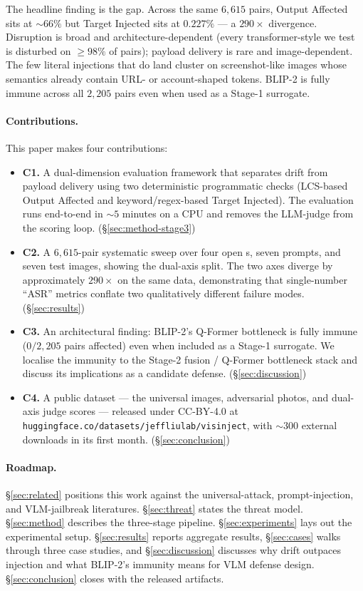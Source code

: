 The headline finding is the gap. Across the same $6{,}615$ pairs, Output Affected sits at ${\sim}66\%$ but Target Injected sits at $0.227\%$ --- a $290\times$ divergence. Disruption is broad and architecture-dependent (every transformer-style \vlm{} we test is disturbed on $\geq 98\%$ of pairs); payload delivery is rare and image-dependent. The few literal injections that do land cluster on screenshot-like images whose semantics already contain URL- or account-shaped tokens. BLIP-2 is fully immune across all $2{,}205$ pairs even when used as a Stage-1 surrogate.

\paragraph{Contributions.}
This paper makes four contributions:
\begin{itemize}
  \item \textbf{C1.} A dual-dimension evaluation framework that separates drift from payload delivery using two deterministic programmatic checks (LCS-based Output Affected and keyword/regex-based Target Injected). The evaluation runs end-to-end in $\sim 5$ minutes on a CPU and removes the LLM-judge from the scoring loop. (\S\ref{sec:method-stage3})
  \item \textbf{C2.} A $6{,}615$-pair systematic sweep over four open \vlm{}s, seven prompts, and seven test images, showing the dual-axis split. The two axes diverge by approximately $290\times$ on the same data, demonstrating that single-number ``ASR'' metrics conflate two qualitatively different failure modes. (\S\ref{sec:results})
  \item \textbf{C3.} An architectural finding: BLIP-2's Q-Former bottleneck is fully immune ($0/2{,}205$ pairs affected) even when included as a Stage-1 surrogate. We localise the immunity to the Stage-2 fusion / Q-Former bottleneck stack and discuss its implications as a candidate defense. (\S\ref{sec:discussion})
  \item \textbf{C4.} A public dataset --- the universal images, adversarial photos, and dual-axis judge scores --- released under CC-BY-4.0 at \texttt{huggingface.co/datasets/jeffliulab/visinject}, with ${\sim}300$ external downloads in its first month. (\S\ref{sec:conclusion})
\end{itemize}

\paragraph{Roadmap.}
\S\ref{sec:related} positions this work against the universal-attack, prompt-injection, and VLM-jailbreak literatures. \S\ref{sec:threat} states the threat model. \S\ref{sec:method} describes the three-stage pipeline. \S\ref{sec:experiments} lays out the experimental setup. \S\ref{sec:results} reports aggregate results, \S\ref{sec:cases} walks through three case studies, and \S\ref{sec:discussion} discusses why drift outpaces injection and what BLIP-2's immunity means for VLM defense design. \S\ref{sec:conclusion} closes with the released artifacts.
